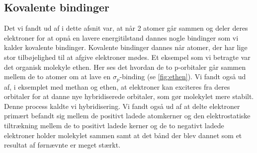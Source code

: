 \subsection{Kovalente bindinger}
Det vi fandt ud af i dette afsnit var, at når 2 atomer går sammen og deler deres elektroner for at opnå en lavere energitilstand dannes nogle bindinger som vi kalder kovalente bindinger. Kovalente bindinger dannes når atomer, der har lige stor tilbøjelighed til at afgive elektroner mødes. Et eksempel som vi betragte var det organisk molekyle ethen. Her ses det hvordan de to p-orbitaler går sammen mellem de to atomer om at lave en $\sigma_p$-binding (se \ref{fig:ethen}). Vi fandt også ud af, i eksemplet med methan og ethen, at elektroner kan exciteres fra deres orbitaler for at danne nye hybridiserede orbitaler, som gør molekylet mere stabilt. Denne process kaldte vi hybridisering. Vi fandt også ud af at delte elektroner primært befandt sig mellem de positivt ladede atomkerner og den elektrostatiske tiltrækning mellem de to positivt ladede kerner og de to negativt ladede elektroner holder molekylet sammen samt at det bånd der blev dannet som et resultat af førnævnte er meget stærkt.


